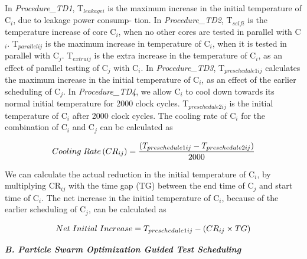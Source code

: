 \documentclass[conference]{IEEEtran}
\begin{document}
	\par
	In \textit{Procedure\_TD1}, T$_{leakagei}$ is the maximum increase in
the initial temperature of C$_{i}$, due to leakage power consump-
tion. In \textit{Procedure\_TD2}, T$_{selfi}$ is the temperature increase
of core C$_{i}$, when no other cores are tested in parallel with C$_{i}$.
T$_{parallelij}$ is the maximum increase in temperature of C$_{i}$, when
it is tested in parallel with C$_{j}$. T$_{extraij}$ is the extra increase
in the temperature of C$_{i}$, as an effect of parallel testing of
C$_{j}$ with C$_{i}$. In \textit{Procedure\_TD3}, T$_{preschedule1ij}$ calculates
the maximum increase in the initial temperature of C$_{i}$, as an
effect of the earlier scheduling of C$_{j}$. In \textit{Procedure\_TD4}, we
allow C$_{i}$ to cool down towards its normal initial temperature
for 2000 clock cycles. T$_{preschedule2ij}$ is the initial temperature
of C$_{i}$ after 2000 clock cycles. The cooling rate of C$_{i}$ for the
combination of C$_{i}$ and C$_{j}$ can be calculated as


\begin{equation}
Cooling \hspace{.1cm} Rate \left(CR_{ij}\right) = \frac{\left(T_{preschedule1ij}-T_{preschedule2ij}\right)}{2000}\\
\end{equation}

We can calculate the actual reduction in the initial temperature
of C$_{i}$, by multiplying CR$_{ij}$ with the time gap (TG) between
the end time of C$_{j}$ and start time of C$_{i}$. The net increase in
the initial temperature of C$_{i}$, because of the earlier scheduling
of C$_{j}$, can be calculated as

\begin{equation}
Net \hspace{.1cm} Initial \hspace{.1cm} Increase = T_{preschedule1ij}-\left(CR_{ij} \times TG\right)
\end{equation}

\textbf{\textit{ B. Particle Swarm Optimization Guided Test Scheduling}}\\
\end{document}
